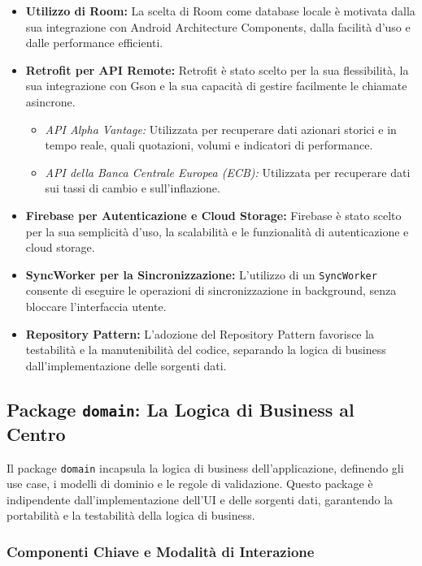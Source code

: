 \begin{itemize}
    \item \textbf{Utilizzo di Room:} La scelta di Room come database locale è
    motivata dalla sua integrazione con Android Architecture Components, dalla
    facilità d'uso e dalle performance efficienti.
    \item \textbf{Retrofit per API Remote:} Retrofit è stato scelto per la sua
    flessibilità, la sua integrazione con Gson e la sua capacità di gestire
    facilmente le chiamate asincrone.
        \begin{itemize}
            \item \textit{API Alpha Vantage:} Utilizzata per recuperare dati
            azionari storici e in tempo reale, quali quotazioni, volumi e
            indicatori di performance.
            \item \textit{API della Banca Centrale Europea (ECB):} Utilizzata
            per recuperare dati sui tassi di cambio e sull'inflazione.
        \end{itemize}
    \item \textbf{Firebase per Autenticazione e Cloud Storage:} Firebase è stato
    scelto per la sua semplicità d'uso, la scalabilità e le funzionalità di
    autenticazione e cloud storage.
    \item \textbf{SyncWorker per la Sincronizzazione:} L'utilizzo di un
    \texttt{SyncWorker} consente di eseguire le operazioni di sincronizzazione
    in background, senza bloccare l'interfaccia utente.
    \item \textbf{Repository Pattern:} L'adozione del Repository Pattern
    favorisce la testabilità e la manutenibilità del codice, separando la logica
    di business dall'implementazione delle sorgenti dati.
\end{itemize}

\subsection{Package \texttt{domain}: La Logica di Business al
Centro}\label{subsec:package-texttt{domain}:-la-logica-di-business-al-centro}

Il package \texttt{domain} incapsula la logica di business dell'applicazione,
definendo gli use case, i modelli di dominio e le regole di validazione.
Questo
package è indipendente dall'implementazione dell'UI e delle sorgenti dati,
garantendo la portabilità e la testabilità della logica di business.

\subsubsection{Componenti Chiave e Modalità di Interazione}

